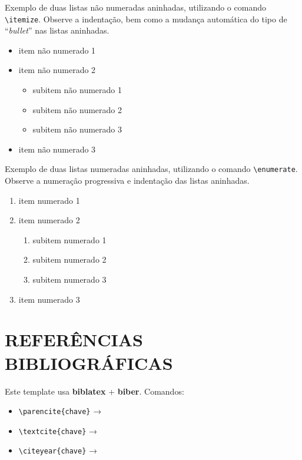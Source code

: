 Exemplo de duas listas não numeradas aninhadas, utilizando o comando \verb|\itemize|. Observe a indentação, bem como a mudança automática do tipo de ``\textit{bullet}''{} nas listas aninhadas.

\begin{itemize}
    \item item não numerado 1
    \item item não numerado 2
          \begin{itemize}
              \item subitem não numerado 1
              \item subitem não numerado 2
              \item subitem não numerado 3
          \end{itemize}
    \item item não numerado 3
\end{itemize}

Exemplo de duas listas numeradas aninhadas, utilizando o comando \verb|\enumerate|. Observe a numeração progressiva e indentação das listas aninhadas.

\begin{enumerate}
    \item item numerado 1
    \item item numerado 2
          \begin{enumerate}
              \item subitem numerado 1
              \item subitem numerado 2
              \item subitem numerado 3
          \end{enumerate}
    \item item numerado 3
\end{enumerate}

\chapter{REFERÊNCIAS BIBLIOGRÁFICAS}
\label{chap:referencias}

Este template usa \textbf{biblatex} + \textbf{biber}. Comandos:

\begin{itemize}
    \item \verb|\parencite{chave}| → \parencite{chave}
    \item \verb|\textcite{chave}|  → \textcite{chave}
    \item \verb|\citeyear{chave}|  → \citeyear{chave}
\end{itemize}

